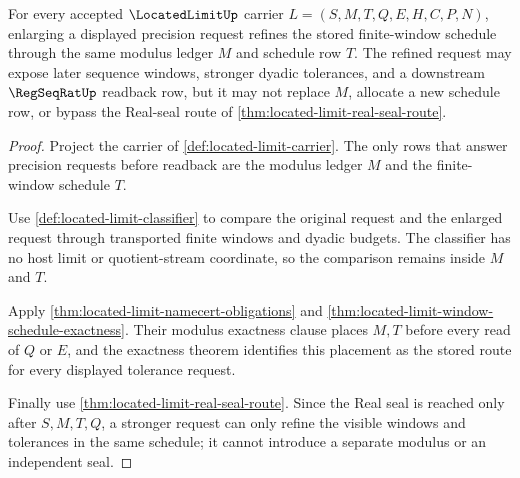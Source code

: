 \begin{theorem}
\label{thm:located-limit-schedule-monotonicity}
For every accepted $\LocatedLimitUp$ carrier $L=(S,M,T,Q,E,H,C,P,N)$, enlarging a displayed precision request refines the stored finite-window schedule through the same modulus ledger $M$ and schedule row $T$. The refined request may expose later sequence windows, stronger dyadic tolerances, and a downstream $\RegSeqRatUp$ readback row, but it may not replace $M$, allocate a new schedule row, or bypass the Real-seal route of \autoref{thm:located-limit-real-seal-route}.
\end{theorem}
\begin{proof}
Project the carrier of \autoref{def:located-limit-carrier}. The only rows that answer precision requests before readback are the modulus ledger $M$ and the finite-window schedule $T$.

Use \autoref{def:located-limit-classifier} to compare the original request and the enlarged request through transported finite windows and dyadic budgets. The classifier has no host limit or quotient-stream coordinate, so the comparison remains inside $M$ and $T$.

Apply \autoref{thm:located-limit-namecert-obligations} and \autoref{thm:located-limit-window-schedule-exactness}. Their modulus exactness clause places $M,T$ before every read of $Q$ or $E$, and the exactness theorem identifies this placement as the stored route for every displayed tolerance request.

Finally use \autoref{thm:located-limit-real-seal-route}. Since the Real seal is reached only after $S,M,T,Q$, a stronger request can only refine the visible windows and tolerances in the same schedule; it cannot introduce a separate modulus or an independent seal.
\end{proof}

